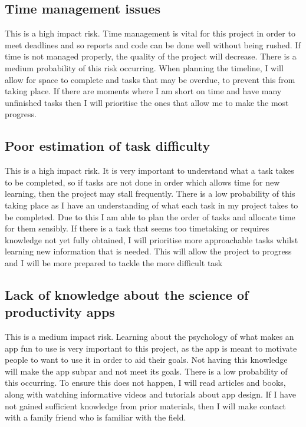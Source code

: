 \documentclass[12pt]{article}
\begin{document}
\subsection{Time management issues}
This is a high impact risk. Time management is vital for this project in order to meet deadlines and so reports and code can be done well without being rushed. If time is not managed properly, the quality of the project will decrease. There is a medium probability of this risk occurring. When planning the timeline, I will allow for space to complete and tasks that may be overdue, to prevent this from taking place. If there are moments where I am short on time and have many unfinished tasks then I will prioritise the ones that allow me to make the most progress.

\subsection{Poor estimation of task difficulty}
This is a high impact risk. It is very important to understand what a task takes to be completed, so if tasks are not done in order which allows time for new learning, then the project may stall frequently. There is a low probability of this taking place as I have an understanding of what each task in my project takes to be completed. Due to this I am able to plan the order of tasks and allocate time for them sensibly. If there is a task that seems too timetaking or requires knowledge not yet fully obtained, I will prioritise more approachable tasks whilst learning new information that is needed. This will allow the project to progress and I will be more prepared to tackle the more difficult task

\subsection{Lack of knowledge about the science of productivity apps}
This is a medium impact risk. Learning about the psychology of what makes an app fun to use is very important to this project, as the app is meant to motivate people to want to use it in order to aid their goals. Not having this knowledge will make the app subpar and not meet its goals. There is a low probability of this occurring. To ensure this does not happen, I will read articles and books, along with watching informative videos and tutorials about app design. If I have not gained sufficient knowledge from prior materials, then I will make contact with a family friend who is familiar with the field.
\end{document}
